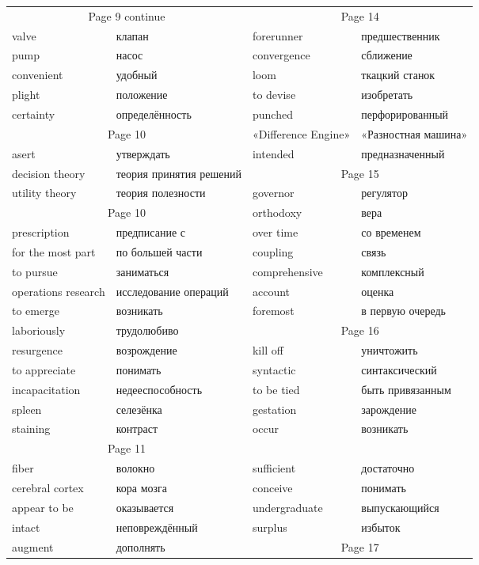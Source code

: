 \documentclass[12pt]{article}
\begin{document}
\begin{tabular}{| l l | l l | }
  \hline

  \multicolumn{2}{|c|}{Page 9 continue} & \multicolumn{2}{c|}{Page 14} \\
  valve & клапан & forerunner & предшественник\\
  pump & насос & convergence & сближение \\
  convenient & удобный & loom & ткацкий станок \\
  plight & положение & to devise & изобретать \\
  certainty & определённость & punched & перфорированный \\

  \cline{1-2}\multicolumn{2}{|c|}{Page 10} & «Difference Engine» & «Разностная машина» \\
  asert & утверждать & intended & предназначенный \\ \cline{3-4}
  decision theory & теория принятия решений & \multicolumn{2}{c|}{Page 15} \\ 
  utility theory & теория полезности & governor & регулятор \\
  
  \cline{1-2} \multicolumn{2}{c|}{Page 10} & orthodoxy & вера \\ 
  prescription & предписание с & over time & со временем \\
  for the most part & по большей части & coupling & связь \\
  to pursue & заниматься & comprehensive & комплексный \\
  operations research & исследование операций & account & оценка \\

  to emerge & возникать & foremost & в первую очередь \\  \cline{3-4}
  laboriously & трудолюбиво& \multicolumn{2}{c|}{Page 16} \\
  resurgence & возрождение & kill off & уничтожить \\
  to appreciate & понимать & syntactic & синтаксический \\
  incapacitation & недееспособность & to be tied & быть привязанным \\ 
  spleen & селезёнка & gestation & зарождение \\
  staining & контраст & occur & возникать \\ 
  \cline{1-2}

  \multicolumn{2}{c|}{Page 11} \\
  fiber & волокно & sufficient & достаточно \\
  cerebral cortex & кора мозга & conceive & понимать \\
  appear to be & оказывается & undergraduate & выпускающийся \\
  intact & неповреждённый & surplus & избыток \\ \cline{3-4}
  augment & дополнять & \multicolumn{2}{c|}{Page 17} \\ \cline{1-2}


\end{tabular}
\end{document}
